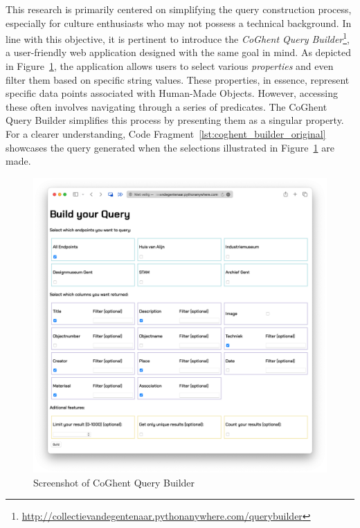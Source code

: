 This research is primarily centered on simplifying the query construction process, especially for culture enthusiasts who may not possess a technical background. In line with this objective, it is pertinent to introduce the \textit{CoGhent Query Builder}\footnote{\url{http://collectievandegentenaar.pythonanywhere.com/querybuilder}}, a user-friendly web application designed with the same goal in mind. As depicted in Figure~\ref{fig:og_query_builder}, the application allows users to select various \textit{properties} and even filter them based on specific string values. These properties, in essence, represent specific data points associated with Human-Made Objects. However, accessing these often involves navigating through a series of predicates. The CoGhent Query Builder simplifies this process by presenting them as a singular property. For a clearer understanding, Code Fragment~\ref{lst:coghent_builder_original} showcases the query generated when the selections illustrated in Figure~\ref{fig:og_query_builder} are made.

\begin{figure}[htbp]
    \centering
	\includegraphics[width=\textwidth]{images/og_query_builder.png}
	\caption{Screenshot of CoGhent Query Builder}
	\label{fig:og_query_builder}
\end{figure}

